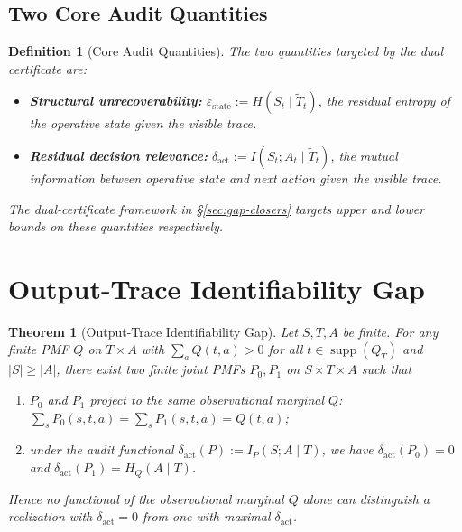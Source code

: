 \documentclass{article}
\newtheorem{definition}{Definition}
\newtheorem{theorem}{Theorem}
\begin{document}
\subsection{Two Core Audit Quantities}

\begin{definition}[Core Audit Quantities]
\label{def:certs}
The two quantities targeted by the dual certificate are:
\begin{itemize}
  \item \textbf{Structural unrecoverability:} $\varepsilon_\text{state} := H(S_t \mid \tilde T_t)$, the residual entropy of the operative state given the visible trace.
  \item \textbf{Residual decision relevance:} $\delta_\text{act} := I(S_t; A_t \mid \tilde T_t)$, the mutual information between operative state and next action given the visible trace.
\end{itemize}
The dual-certificate framework in \S\ref{sec:gap-closers} targets upper and lower bounds on these quantities respectively.
\end{definition}

\section{Output-Trace Identifiability Gap}
\label{sec:identifiability-gap}

\begin{theorem}[Output-Trace Identifiability Gap]
\label{thm:identifiability-gap}
Let $S, T, A$ be finite. For any finite PMF $Q$ on $T \times A$ with $\sum_a Q(t,a) > 0$ for all $t \in \operatorname{supp}(Q_T)$ and $|S| \geq |A|$, there exist two finite joint PMFs $P_0, P_1$ on $S \times T \times A$ such that
\begin{enumerate}
  \item[(i)] $P_0$ and $P_1$ project to the same observational marginal $Q$: $\sum_s P_0(s,t,a) = \sum_s P_1(s,t,a) = Q(t,a)$;
  \item[(ii)] under the audit functional $\delta_\text{act}(P) := I_P(S; A \mid T)$, we have $\delta_\text{act}(P_0) = 0$ and $\delta_\text{act}(P_1) = H_Q(A \mid T)$.
\end{enumerate}
Hence no functional of the observational marginal $Q$ alone can distinguish a realization with $\delta_\text{act}=0$ from one with maximal $\delta_\text{act}$.
\end{theorem}
\end{document}
